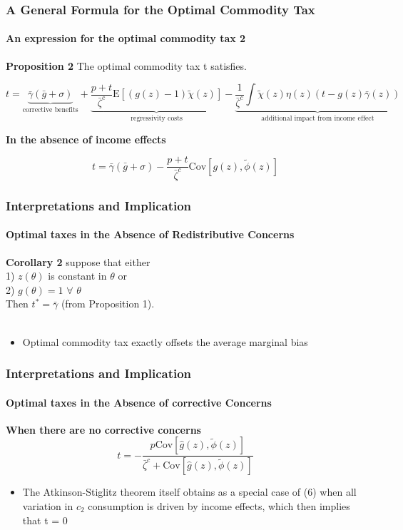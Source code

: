 \documentclass{beamer}
\newcommand{\Cov}{\mathrm{Cov}}
\newcommand{\E}{\mathrm{E}}
\begin{document}
\begin{frame}[shrink=6]
\frametitle{A General Formula for the Optimal Commodity Tax}
\framesubtitle{An expression for the optimal commodity tax 2}

\textbf{Proposition 2} The optimal commodity tax t satisfies. 

$$ t = \underbrace{ \bar{\gamma}(\bar{g} + \sigma)}_\text{corrective benefits} + 
\underbrace{ \frac{p + t}{\bar{\zeta}^c} \E[(g(z)-1) \tilde{\chi}(z)] }_\text{regressivity costs}  - 
\underbrace{ \frac{1}{\bar{\zeta}^c} \int \tilde{\chi}(z) \eta (z) (t-g(z) \bar{\gamma}(z))}_\text{additional impact from income effect}$$

\textbf{In the absence of income effects} 

$$ t = \bar{\gamma}(\bar{g} + \sigma) -  \frac{p + t}{\bar{\zeta}^c} \Cov \left[ g(z), \tilde{\phi}(z)  \right] $$
	 
\end{frame}







\begin{frame}
\frametitle{Interpretations and Implication}
\framesubtitle{Optimal taxes in the Absence of Redistributive Concerns}

\textbf{Corollary 2} suppose that either\\
 1) $z(\theta)$ is constant in $\theta$ or\\
  2) $g(\theta) = 1$ $\forall$ $\theta$ \\
  Then $t^* = \bar{\gamma}$ (from Proposition 1). \\~\\

\begin{itemize}
\item Optimal commodity tax exactly offsets the average marginal bias
\end{itemize}

\end{frame}



\begin{frame}
\frametitle{Interpretations and Implication}
\framesubtitle{Optimal taxes in the Absence of corrective Concerns}

\textbf{When there are no corrective concerns}
$$ t = -\frac{p\Cov \left[ \hat{g}(z),\tilde{\phi}(z) \right]}{\bar{\zeta}^c + \Cov \left[\hat{g}(z), \tilde{\phi}(z) \right]} $$ 

\begin{itemize}
\item The Atkinson-Stiglitz theorem itself obtains as a special case of (6) when all variation
in $c_2$ consumption is driven by income effects, which then implies that t = 0
\end{itemize}
\end{frame}
\end{document}
